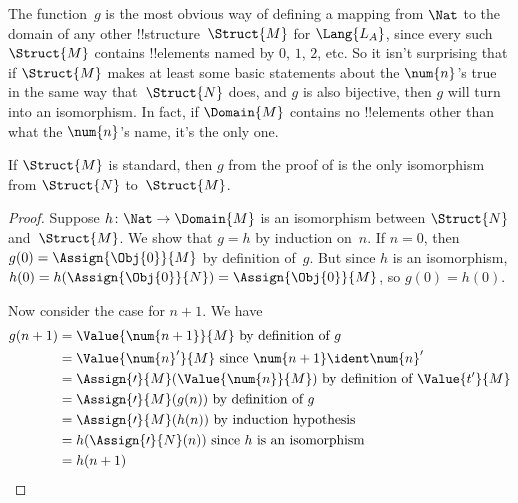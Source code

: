 \documentclass[../../../include/open-logic-section]{subfiles}
\begin{document}
\begin{explain}
The function~$g$ is the most obvious way of defining a mapping from
$\Nat$ to the domain of any other !!{structure}~$\Struct{M}$ for
$\Lang{L_A}$, since every such $\Struct{M}$ contains !!{element}s named
by $\num{0}$, $\num{1}$, $\num{2}$, etc. So it isn't surprising that
if $\Struct{M}$ makes at least some basic statements about the
$\num{n}$'s true in the same way that~$\Struct{N}$ does, and $g$ is
also bijective, then $g$ will turn into an isomorphism.  In fact, if
$\Domain{M}$ contains no !!{element}s other than what the $\num{n}$'s
name, it's the only one.
\end{explain}

\begin{prop}
 If $\Struct{M}$ is standard, then $g$ from
the proof of  is the only isomorphism from $\Struct{N}$ to~$\Struct{M}$.
\end{prop}

\begin{proof}
Suppose $h\colon \Nat \to \Domain{M}$ is an isomorphism between
$\Struct{N}$ and~$\Struct{M}$. We show that $g = h$ by induction
on~$n$. If $n = 0$, then $g(0) = \Assign{\Obj{0}}{M}$ by definition
of~$g$. But since $h$ is an isomorphism, $h(0) =
h(\Assign{\Obj{0}}{N}) =\Assign{\Obj{0}}{M}$, so $g(0) = h(0)$.

Now consider the case for $n+1$. We have
\begin{align*}
  g(n+1) & = \Value{\num{n+1}}{M} \text{ by definition of~$g$}\\
  & = \Value{\num{n}'}{M} \text{ since $\num{n+1}\ident \num{n}'$}\\
  & = \Assign{\prime}{M}(\Value{\num{n}}{M}) 
    \text{ by definition of $\Value{t'}{M}$}\\
  & = \Assign{\prime}{M}(g(n))  \text{ by definition of~$g$}\\
  & = \Assign{\prime}{M}(h(n)) \text{ by induction hypothesis}\\
  & = h(\Assign{\prime}{N}(n)) \text{ since $h$ is an isomorphism}\\
  & = h(n+1)
\end{align*}
\end{proof}
\end{document}
